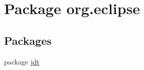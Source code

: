 \hypertarget{namespaceorg_1_1eclipse}{
\section{Package org.eclipse}
\label{namespaceorg_1_1eclipse}
}
\subsection*{Packages}
\begin{DoxyCompactItemize}
\item 
package \hyperlink{namespaceorg_1_1eclipse_1_1jdt}{jdt}
\end{DoxyCompactItemize}
